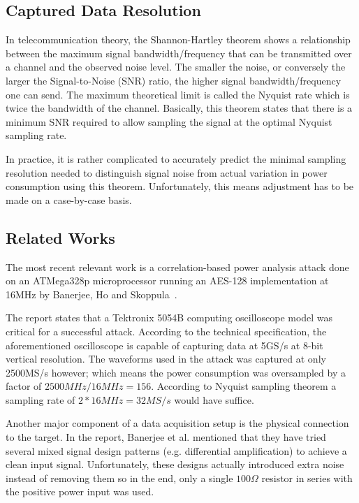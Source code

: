 \documentclass[conference]{IEEEtran}
\begin{document}
\subsection{Captured Data Resolution}
In telecommunication theory, the Shannon-Hartley theorem \cite{shannon1949communication} shows a relationship between the maximum signal bandwidth/frequency that can be transmitted over a channel and the observed noise level. The smaller the noise, or conversely the larger the Signal-to-Noise (SNR) ratio, the higher signal bandwidth/frequency one can send. The maximum theoretical limit is called the Nyquist rate which is twice the bandwidth of the channel. Basically, this theorem states that there is a minimum SNR required to allow sampling the signal at the optimal Nyquist sampling rate.

In practice, it is rather complicated to accurately predict the minimal sampling resolution needed to distinguish signal noise from actual variation in power consumption using this theorem. Unfortunately, this means adjustment has to be made on a case-by-case basis.

\subsection{Related Works}
The most recent relevant work is a correlation-based power analysis attack done on an ATMega328p microprocessor running an AES-128 implementation at 16MHz by Banerjee, Ho and Skoppula~\cite{Banerjee2015}.

The report states that a Tektronix 5054B computing oscilloscope model was critical for a successful attack. According to the technical specification, the aforementioned oscilloscope is capable of capturing data at 5GS/s at 8-bit vertical resolution. The waveforms used in the attack was captured at only 2500MS/s however; which means the power consumption was oversampled by a factor of $2500\mathit{MHz}/16\mathit{MHz}=156$. According to Nyquist sampling theorem a sampling rate of $2*16\mathit{MHz}=32\mathit{MS/s}$ would have suffice.

Another major component of a data acquisition setup is the physical connection to the target. In the report, Banerjee et al. mentioned that they have tried several mixed signal design patterns (e.g. differential amplification) to achieve a clean input signal. Unfortunately, these designs actually introduced extra noise instead of removing them so in the end, only a single $100\Omega$ resistor in series with the positive power input was used.
\end{document}
